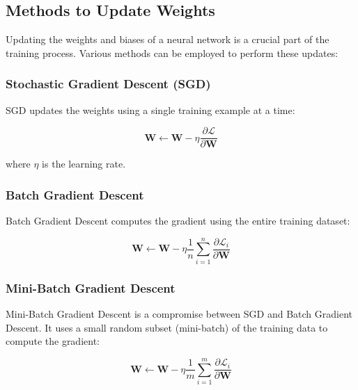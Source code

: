     \subsection{Methods to Update Weights}
    
        Updating the weights and biases of a neural network is a crucial part of the training process. Various methods can be employed to perform these updates:
    
        \subsubsection{Stochastic Gradient Descent (SGD)}
    
            SGD updates the weights using a single training example at a time:
    
            \begin{equation}
            \mathbf{W} \leftarrow \mathbf{W} - \eta \frac{\partial \mathcal{L}}{\partial \mathbf{W}}
            \end{equation}
    
            where \( \eta \) is the learning rate.
    
        \subsubsection{Batch Gradient Descent}
    
            Batch Gradient Descent computes the gradient using the entire training dataset:
            
            \begin{equation}
            \mathbf{W} \leftarrow \mathbf{W} - \eta \frac{1}{n} \sum_{i=1}^n \frac{\partial \mathcal{L}_i}{\partial \mathbf{W}}
            \end{equation}
    
        \subsubsection{Mini-Batch Gradient Descent}
    
            Mini-Batch Gradient Descent is a compromise between SGD and Batch Gradient Descent. It uses a small random subset (mini-batch) of the training data to compute the gradient:
    
            \begin{equation}
            \mathbf{W} \leftarrow \mathbf{W} - \eta \frac{1}{m} \sum_{i=1}^m \frac{\partial \mathcal{L}_i}{\partial \mathbf{W}}
            \end{equation}
    
